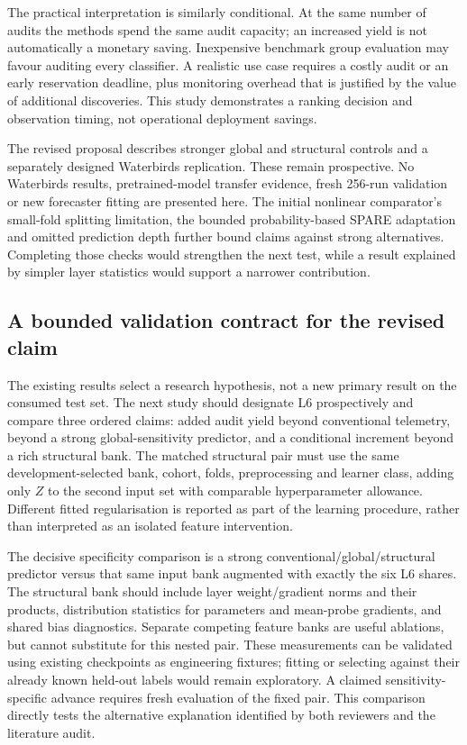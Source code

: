 The practical interpretation is similarly conditional. At the same number of audits the methods spend the same audit capacity; an increased yield is not automatically a monetary saving. Inexpensive benchmark group evaluation may favour auditing every classifier. A realistic use case requires a costly audit or an early reservation deadline, plus monitoring overhead that is justified by the value of additional discoveries. This study demonstrates a ranking decision and observation timing, not operational deployment savings.

The revised proposal describes stronger global and structural controls and a separately designed Waterbirds replication. These remain prospective. No Waterbirds results, pretrained-model transfer evidence, fresh 256-run validation or new forecaster fitting are presented here. The initial nonlinear comparator's small-fold splitting limitation, the bounded probability-based SPARE adaptation and omitted prediction depth further bound claims against strong alternatives. Completing those checks would strengthen the next test, while a result explained by simpler layer statistics would support a narrower contribution.


\subsection{A bounded validation contract for the revised claim}
The existing results select a research hypothesis, not a new primary result on the consumed test set. The next study should designate L6 prospectively and compare three ordered claims: added audit yield beyond conventional telemetry, beyond a strong global-sensitivity predictor, and a conditional increment beyond a rich structural bank. The matched structural pair must use the same development-selected bank, cohort, folds, preprocessing and learner class, adding only $Z$ to the second input set with comparable hyperparameter allowance. Different fitted regularisation is reported as part of the learning procedure, rather than interpreted as an isolated feature intervention.

The decisive specificity comparison is a strong conventional/global/structural predictor versus that same input bank augmented with exactly the six L6 shares. The structural bank should include layer weight/gradient norms and their products, distribution statistics for parameters and mean-probe gradients, and shared bias diagnostics. Separate competing feature banks are useful ablations, but cannot substitute for this nested pair. These measurements can be validated using existing checkpoints as engineering fixtures; fitting or selecting against their already known held-out labels would remain exploratory. A claimed sensitivity-specific advance requires fresh evaluation of the fixed pair. This comparison directly tests the alternative explanation identified by both reviewers and the literature audit.

